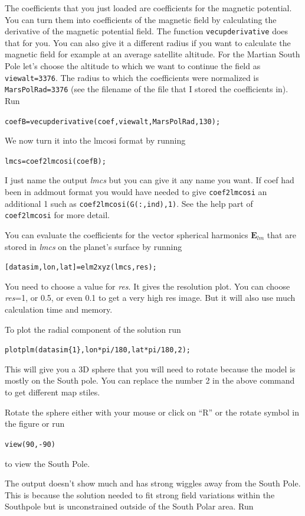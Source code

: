 \documentclass[11pt]{article}
\newcommand{\Efun}{\boldsymbol{E}}
\begin{document}
The coefficients that you just loaded are coefficients for the magnetic potential. You can turn them into coefficients of the magnetic field by calculating the derivative of the magnetic potential field. The function \verb+vecupderivative+ does that for you. You can also give it a different radius if you want to calculate the magnetic field for example at an average satellite altitude. For the Martian South Pole let's choose the altitude to which we want to continue the field as \verb+viewalt=3376+. The radius to which the coefficients were normalized is \verb+MarsPolRad=3376+ (see the filename of the file that I stored the coefficients in). Run

\verb+coefB=vecupderivative(coef,viewalt,MarsPolRad,130);+

We now turn it into the lmcosi format by running

\qquad \verb+lmcs=coef2lmcosi(coefB);+

I just name the output \emph{lmcs} but you can give it any name you want. If coef had been in addmout format you would have needed to give \verb+coef2lmcosi+ an additional 1 such as \verb+coef2lmcosi(G(:,ind),1)+. See the help part of \verb+coef2lmcosi+ for more detail.

You can evaluate the coefficients for the vector spherical harmonics $\Efun_{lm}$ that are stored in \emph{lmcs} on the planet's surface by running 

\qquad\verb+[datasim,lon,lat]=elm2xyz(lmcs,res);+

You need to choose a value for \emph{res}. It gives the resolution plot. You can choose \emph{res}=1, or 0.5, or even 0.1 to get a very high res image. But it will also use much calculation time and memory.

To plot the radial component of the solution run 

\qquad\verb+plotplm(datasim{1},lon*pi/180,lat*pi/180,2);+

This will give you a 3D sphere that you will need to rotate because the model is mostly on the South pole. You can replace the number 2 in the above command to get different map stiles.

Rotate the sphere either with your mouse or click on ``R'' or the rotate symbol in the figure or run

\qquad\verb+view(90,-90)+

to view the South Pole.

The output doesn't show much and has strong wiggles away from the South Pole. This is because the solution needed to fit strong field variations within the Southpole but is unconstrained outside of the South Polar area. Run
\end{document}

